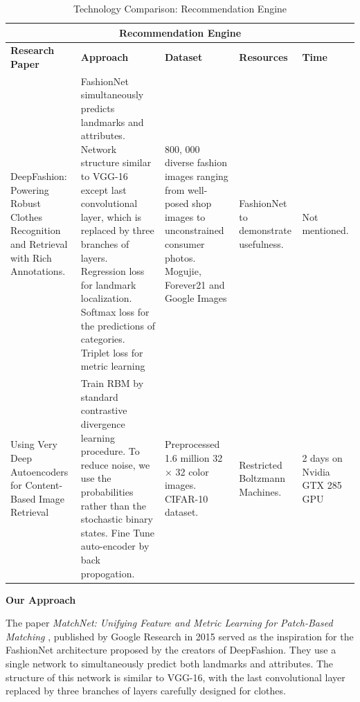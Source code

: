 \begin{table}[H]
\begin{tabular}{ @{}|p{3cm}|p{4cm}|p{2.5cm}|p{2.5cm}|p{2.5cm}|  }
 \hline
 \multicolumn{5}{|c|}{\textbf{Recommendation Engine}} \\
 \hline
 \textbf{Research Paper} & \textbf{Approach} & \textbf{Dataset} & \textbf{Resources} & \textbf{Time}\\
 \hline
 DeepFashion: Powering Robust Clothes Recognition and Retrieval with Rich Annotations. & FashionNet simultaneously predicts landmarks and attributes. Network structure similar to VGG-16 except last convolutional layer, which is replaced by three branches of layers. Regression loss for landmark localization. Softmax loss for the predictions of categories. Triplet loss for metric learning & 800, 000 diverse
 fashion images ranging from well-posed shop images to unconstrained consumer photos. 
 Mogujie, Forever21 and Google Images & FashionNet to demonstrate usefulness. & Not mentioned. \\
\hline

Using Very Deep Autoencoders for Content-Based Image Retrieval & Train RBM by standard contrastive divergence learning procedure. To reduce noise, we use the probabilities rather than the stochastic binary states. Fine Tune auto-encoder by back propogation.  & Preprocessed 1.6 million 32 × 32 color images. CIFAR-10 dataset. & Restricted Boltzmann Machines. & 2 days on Nvidia GTX 285 GPU \\
\hline

\end{tabular}
\caption{Technology Comparison: Recommendation Engine}
\label{table:recommendation-engine 3}
\end{table}


\noindent\textbf{Our Approach}

\noindent The paper \textit{MatchNet: Unifying Feature and Metric Learning for Patch-Based Matching} \cite{matchnet}, published by Google Research in 2015 served as the inspiration for the FashionNet architecture proposed by the creators of DeepFashion. They use a single network to simultaneously predict both landmarks and attributes. The structure of this network is similar to VGG-16, with the last convolutional layer replaced by three branches of layers carefully designed for clothes.

